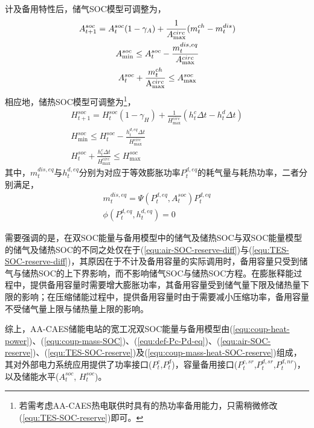 计及备用特性后，储气SOC模型可调整为，
\begin{subequations}
\label{equ:air-SOC-reserve}
\begin{gather}
A_{t + 1}^{soc} = A_t^{soc}(1-\gamma_A) + \frac{1}{{{A_{\max }^{circ}}}}({m_t^{ch} - m_t^{dis}})\\
A_{\min }^{soc} \le A_t^{soc} - \frac{{m_t^{dis,eq}}}{{{A_{\max}^{circ}}}}\label{equ:air-SOC-reserve-diff}\\
{{A}}_t^{soc} + \frac{{m_t^{ch}}}{{{{\rm{A}}_{\max}^{circ}}}} \le A_{\max }^{soc}
\end{gather}
\end{subequations}
相应地，储热SOC模型可调整为\footnote{若需考虑AA-CAES热电联供时具有的热功率备用能力，只需稍微修改(\ref{equ:TES-SOC-reserve})即可。}，
\begin{subequations}
\label{equ:TES-SOC-reserve}
\begin{gather}
H_{t + 1}^{soc} = H_t^{soc}(1-\gamma_H) + \frac{1}{{{H_{\max}^{circ}}}}({h_t^c\Delta t - h_t^d\Delta t})\label{equ:TES-SOC-reserve-S1}\\
H_{\min }^{soc} \le H_t^{soc} - \frac{{h_t^{d,eq}\Delta t}}{{{H_{\max}^{circ}}}}\label{equ:TES-SOC-reserve-diff}\\
H_t^{soc} + \frac{{h_t^c\Delta t}}{{{H_{\max}^{circ}}}} \le H_{\max }^{soc}
\end{gather}
\end{subequations}
其中，$m_t^{dis,eq}$与$h_t^{d,eq}$分别为对应于等效膨胀功率$P_t^{d,eq}$的耗气量与耗热功率，二者分别满足，
\begin{subequations}
\label{equ:coup-mass-heat-SOC-reserve}
\begin{gather}
m_t^{dis,eq} = \Psi ({P_t^{d,eq},A_t^{soc}})P_t^{d,eq}\label{equ:coup-mass-SOC-reserve-S3}\\
\phi ({P_t^{d,eq},h_t^{d,eq}}) = 0\label{equ:coup-heat-power-reserve-S3}
\end{gather}
\end{subequations}

需要强调的是，在双SOC能量与备用模型中的储气及储热SOC与双SOC能量模型的储气及储热SOC的不同之处仅在于(\ref{equ:air-SOC-reserve-diff})与(\ref{equ:TES-SOC-reserve-diff})，其原因在于不计及备用容量的实际调用时，备用容量只受到储气与储热SOC的上下界影响，而不影响储气SOC与储热SOC方程。在膨胀释能过程中，提供备用容量时需要增大膨胀功率，其备用容量受到储气量下限及储热量下限的影响；在压缩储能过程中，提供备用容量时由于需要减小压缩功率，备用容量不受储气量上限与储热量上限的影响。

综上，AA-CAES储能电站的宽工况双SOC能量与备用模型由(\ref{equ:coup-heat-power})、(\ref{equ:coup-mass-SOC})、(\ref{equ:def-Pc-Pd-eq})、(\ref{equ:air-SOC-reserve})、(\ref{equ:TES-SOC-reserve})及(\ref{equ:coup-mass-heat-SOC-reserve})组成，其对外部电力系统应用提供了功率接口($P_t^c$,$P_t^d$)，容量备用接口($P_t^{c,sr}$,$P_t^{d,sr}$,$P_t^{d,nr}$)，以及储能水平($A_t^{soc}$, $H_t^{soc}$)。

